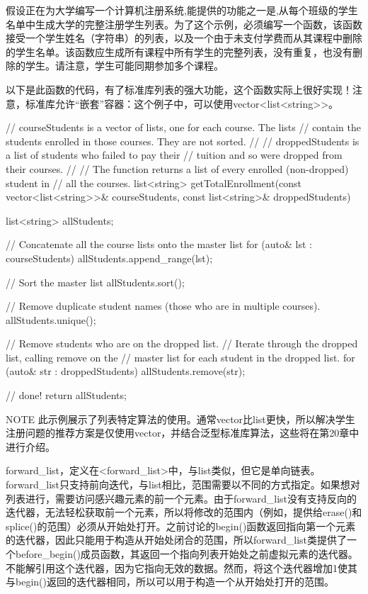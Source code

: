 
假设正在为大学编写一个计算机注册系统,能提供的功能之一是,从每个班级的学生名单中生成大学的完整注册学生列表。为了这个示例，必须编写一个函数，该函数接受一个学生姓名（字符串）的列表，以及一个由于未支付学费而从其课程中删除的学生名单。该函数应生成所有课程中所有学生的完整列表，没有重复，也没有删除的学生。请注意，学生可能同期参加多个课程。

以下是此函数的代码，有了标准库列表的强大功能，这个函数实际上很好实现！注意，标准库允许“嵌套”容器：这个例子中，可以使用vector<list<string>{}>。

\begin{cpp}
// courseStudents is a vector of lists, one for each course. The lists
// contain the students enrolled in those courses. They are not sorted.
//
// droppedStudents is a list of students who failed to pay their
// tuition and so were dropped from their courses.
//
// The function returns a list of every enrolled (non-dropped) student in
// all the courses.
list<string> getTotalEnrollment(const vector<list<string>>& courseStudents,
                                const list<string>& droppedStudents)
{
    list<string> allStudents;

    // Concatenate all the course lists onto the master list
    for (auto& lst : courseStudents) {
        allStudents.append_range(lst);
    }

    // Sort the master list
    allStudents.sort();

    // Remove duplicate student names (those who are in multiple courses).
    allStudents.unique();

    // Remove students who are on the dropped list.
    // Iterate through the dropped list, calling remove on the
    // master list for each student in the dropped list.
    for (auto& str : droppedStudents) {
        allStudents.remove(str);
    }

    // done!
    return allStudents;
}
\end{cpp}

\begin{myNotic}{NOTE}
此示例展示了列表特定算法的使用。通常vector比list更快，所以解决学生注册问题的推荐方案是仅使用vector，并结合泛型标准库算法，这些将在第20章中进行介绍。
\end{myNotic}


forward\_list，定义在<forward\_list>中，与list类似，但它是单向链表。forward\_list只支持前向迭代，与list相比，范围需要以不同的方式指定。如果想对列表进行，需要访问感兴趣元素的前一个元素。由于forward\_list没有支持反向的迭代器，无法轻松获取前一个元素，所以将修改的范围内（例如，提供给erase()和splice()的范围）必须从开始处打开。之前讨论的begin()函数返回指向第一个元素的迭代器，因此只能用于构造从开始处闭合的范围，所以forward\_list类提供了一个before\_begin()成员函数，其返回一个指向列表开始处之前虚拟元素的迭代器。不能解引用这个迭代器，因为它指向无效的数据。然而，将这个迭代器增加1使其与begin()返回的迭代器相同，所以可以用于构造一个从开始处打开的范围。

